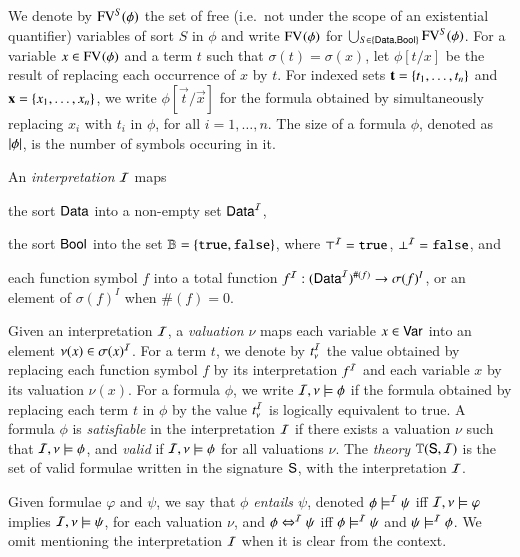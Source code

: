 \documentclass[10pt,conference,letterpaper,twocolumn]{IEEEtran}
\begin{document}
We denote by $\mathrm{FV}^{S}(\phi)$ the set of free (i.e.\ not under the scope
of an existential quantifier) variables of sort $S$ in $\phi$ and
write $\mathrm{FV}^{}(\phi)$ for $\bigcup_{S \in \left\{ \mathsf{Data},\mathsf{Bool} \right\}}
\mathrm{FV}^{S}(\phi)$. For a variable $x \in \mathrm{FV}^{}(\phi)$ and a term $t$ such
that $\sigma(t) = \sigma(x)$, let $\phi[t/x]$ be the result of
replacing each occurrence of $x$ by $t$. For indexed sets
$\mathbf t=\left\{ t_1,\ldots,t_n \right\}$ and $\mathbf x=\left\{ x_1,\ldots,x_n \right\}$, we
write $\phi[\vec{t}/\vec{x}]$ for the formula obtained by
simultaneously replacing $x_i$ with $t_i$ in $\phi$, for all
$i=1,\ldots,n$.
%
%
The size of a formula $\phi$, denoted as ${|{\phi}|}$, is the number
of symbols occuring in it.

An \emph{interpretation} $\mathcal{I}$ maps\begin{inparaenum}[(1)]
\item the sort $\mathsf{Data}$ into a non-empty set $\mathsf{Data}^{\mathcal{I}}$, 
%
\item the sort $\mathsf{Bool}$ into the set $\mathbb{B} = \left\{ \mathtt{true},\mathtt{false} \right\}$, where
  $\top^{\mathcal{I}} = \mathtt{true}$, $\bot^{\mathcal{I}} = \mathtt{false}$, and
%
\item each function symbol $f$ into a total function $f^{\mathcal{I}} :
  (\mathsf{Data}^{\mathcal{I}})^{\#(f)} \rightarrow \sigma(f)^I$, or an element of
  $\sigma(f)^I$ when $\#(f)=0$.
\end{inparaenum}
Given an interpretation $\mathcal{I}$, a \emph{valuation} $\nu$ maps each
variable $x \in \mathsf{Var}$ into an element $\nu(x) \in \sigma(x)^{\mathcal{I}}$. For
a term $t$, we denote by $t^{\mathcal{I}}_\nu$ the value obtained by replacing
each function symbol $f$ by its interpretation $f^{\mathcal{I}}$ and each
variable $x$ by its valuation $\nu(x)$. For a formula $\phi$, we write
$\mathcal{I},\nu \models \phi$ if the formula obtained by replacing each term
$t$ in $\phi$ by the value $t^{\mathcal{I}}_\nu$ is logically equivalent to true.
A formula $\phi$ is \emph{satisfiable} in the interpretation $\mathcal{I}$ if
there exists a valuation $\nu$ such that $\mathcal{I},\nu \models \phi$, and
\emph{valid} if $\mathcal{I},\nu \models \phi$ for all valuations $\nu$.  The
\emph{theory} $\mathbb{T}(\mathsf{S},\mathcal{I})$ is the set of valid formulae written
in the signature $\mathsf{S}$, with the interpretation $\mathcal{I}$.

Given formulae $\varphi$ and $\psi$, we say that \emph{$\phi$ entails
  $\psi$}, denoted $\phi \models^{\mathcal{I}} \psi$ iff $\mathcal{I},\nu \models \varphi$
implies $\mathcal{I},\nu \models \psi$, for each valuation $\nu$, and $\phi
\Leftrightarrow^{\mathcal{I}} \psi$ iff $\phi \models^{\mathcal{I}} \psi$ and $\psi \models^{\mathcal{I}} \phi$.
We omit mentioning the interpretation $\mathcal{I}$ when it is clear from the
context.
\end{document}

